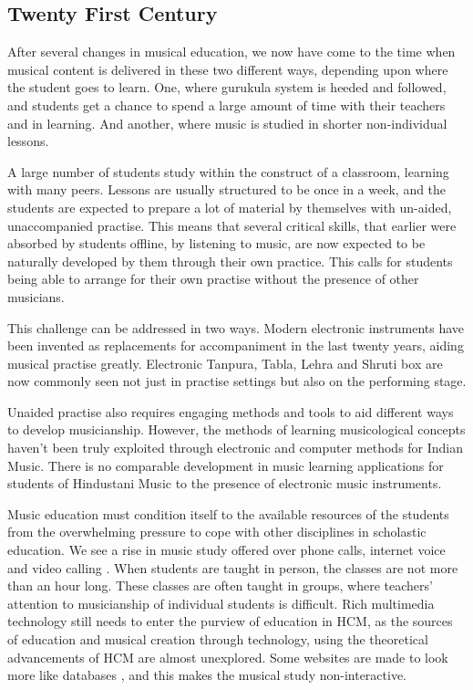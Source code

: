 \documentclass{tufte-handout}
\begin{document}
\subsection{Twenty First Century}After several changes in musical education, we now have come to the time when musical content is delivered in these two different ways, depending upon where the student goes to learn. One, where gurukula system is heeded and followed, and students get a chance to spend a large amount of time with their teachers and in learning. And another, where music is studied in shorter non-individual lessons. 

A large number of students study within the construct of a classroom, learning with many peers. Lessons are usually structured to be once in a week, and the students are expected to prepare a lot of material by themselves with un-aided, unaccompanied practise. This means that several critical skills, that earlier were absorbed by students offline, by listening to music, are now expected to be naturally developed by them through their own practice. This calls for students being able to arrange for their own practise without the presence of other musicians. 

This challenge can be addressed in two ways. Modern electronic instruments have been invented as replacements for accompaniment in the last twenty years, aiding musical practise greatly. Electronic Tanpura, Tabla, Lehra and Shruti box are now commonly seen not just in practise settings but also on the performing stage. 

Unaided practise also requires engaging methods and tools to aid different ways to develop musicianship. However, the methods of learning musicological concepts haven't been truly exploited through electronic and computer methods for Indian Music. There is no comparable development in music learning applications for students of Hindustani Music to the presence of electronic music instruments. 

Music education must condition itself to the available resources of the students from the overwhelming pressure to cope with other disciplines in scholastic education. We see a rise in music study offered over phone calls, internet voice and video calling \cite{sma}. When students are taught in person, the classes are not more than an hour long. These classes are often taught in groups, where teachers' attention to musicianship of individual students is difficult. Rich multimedia technology still needs to enter the purview of education in HCM, as the sources of education and musical creation through technology, using the theoretical advancements of HCM are almost unexplored. Some websites are made to look more like databases \cite{swarganga}, and this makes the musical study non-interactive.
\end{document}

